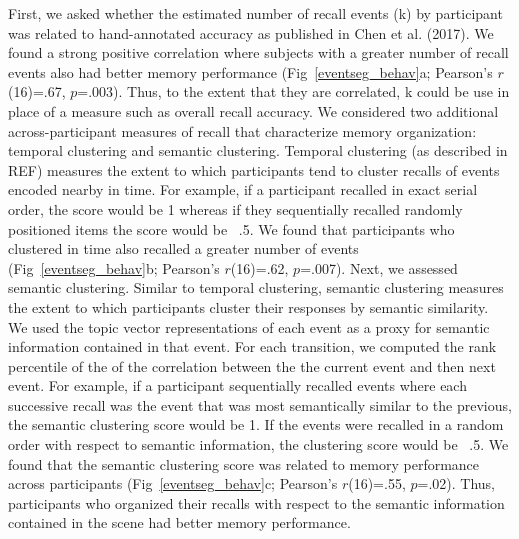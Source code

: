 \documentclass{article}
\begin{document}
{First, we asked whether the estimated number of recall events (k) by participant was related to hand-annotated accuracy as published in Chen et al. (2017).  We found a strong positive correlation where subjects with a greater number of recall events also had better memory performance (Fig~\ref{eventseg_behav}a; Pearson's $r$(16)=.67, $p$=.003).  Thus, to the extent that they are correlated, k could be use in place of a measure such as overall recall accuracy. We considered two additional across-participant measures of recall that characterize memory organization: temporal clustering and semantic clustering. Temporal clustering (as described in REF) measures the extent to which participants tend to cluster recalls of events encoded nearby in time.  For example, if a participant recalled in exact serial order, the score would be 1 whereas if they sequentially recalled randomly positioned items the score would be ~.5.  We found that participants who clustered in time also recalled a greater number of events (Fig~\ref{eventseg_behav}b; Pearson's $r$(16)=.62, $p$=.007). Next, we assessed semantic clustering.  Similar to temporal clustering, semantic clustering measures the extent to which participants cluster their responses by semantic similarity.  We used the topic vector representations of each event as a proxy for semantic information contained in that event.  For each transition, we computed the rank percentile of the of the correlation between the the current event and then next event. For example, if a participant sequentially recalled events where each successive recall was the event that was most semantically similar to the previous, the semantic clustering score would be 1.  If the events were recalled in a random order with respect to semantic information, the clustering score would be ~.5. We found that the semantic clustering score was related to memory performance across participants (Fig~\ref{eventseg_behav}c; Pearson's $r$(16)=.55, $p$=.02).  Thus, participants who organized their recalls with respect to the semantic information contained in the scene had better memory performance.

}
\end{document}
